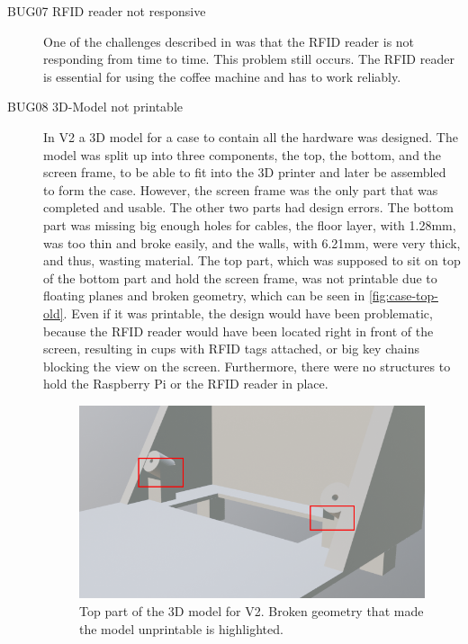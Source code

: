\documentclass[12pt]{article}
\begin{document}
\begin{description}
\item [BUG07 RFID reader not responsive]
\label{pa:BUG07}
One of the challenges described in \cite{Thesis2} was that the RFID reader is not responding from time to time.
This problem still occurs.
The RFID reader is essential for using the coffee machine and has to work reliably.

\item [BUG08 3D-Model not printable]
\label{pa:BUG08}
In V2 a 3D model for a case to contain all the hardware was designed.
The model was split up into three components, the top, the bottom, and the screen frame,
to be able to fit into the 3D printer and later be assembled to form the case.
However, the screen frame was the only part that was completed and usable. The other two parts had design errors.
The bottom part was missing big enough holes for cables, the floor layer, with 1.28mm, was too thin and broke easily, and the walls, with 6.21mm, were very thick, and thus, wasting material.
The top part, which was supposed to sit on top of the bottom part and hold the screen frame,
was not printable due to floating planes and broken geometry, which can be seen in \autoref{fig:case-top-old}.
Even if it was printable, the design would have been problematic, because the RFID reader would have been located right in front of the screen,
resulting in cups with RFID tags attached, or big key chains blocking the view on the screen.
Furthermore, there were no structures to hold the Raspberry Pi or the RFID reader in place.

\begin{figure}[h]
\centering
\includegraphics[width=\textwidth]{./images/case-top-annotated.png}
\caption[Top part of the 3D model for V2.]
{Top part of the 3D model for V2.
Broken geometry that made the model unprintable is highlighted.}
\label{fig:case-top-old}
\end{figure}


\end{description}
\end{document}
